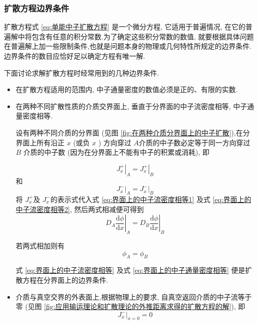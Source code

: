 \documentclass{Sichuan Normal University}
\begin{document}
\subsubsection{扩散方程边界条件}
扩散方程式 \eqref{eq:单能中子扩散方程} 是一个微分方程, 它适用于普遍情况, 在它的普遍解中将包含有任意的积分常数.为了确定这些积分常数的数值, 就要根据具体问题在普遍解上加一些限制条件,也就是问题本身的物理或几何特性所规定的边界条件.边界条件的数目应恰好足以确定方程有唯一解.

下面讨论求解扩散方程时经常用到的几种边界条件.
\begin{itemize} 
    \item 在扩散方程适用的范围内, 中子通量密度的数值必须是正的、有限的实数.

    \item 在两种不同扩散性质的介质交界面上, 垂直于分界面的中子流密度相等, 中子通量密度相等.

设有两种不同介质的分界面 (见图 \ref{fig:在两种介质分界面上的中子扩散}),在分界面上所有沿正 $x$ (或负 $x$ ) 方向穿过 $A$介质的中子数必定等于同一方向穿过 $B$ 介质的中子数 (因为在分界面上不能有中子的积累或消耗), 即

\begin{equation}
\left.J_x^{+}\right|_A=\left.J_x^{+}\right|_B
\label{eq:界面上的中子流密度相等1}
\end{equation}
和
\begin{equation}
\left.J_x^{-}\right|_A=\left.J_x^{-}\right|_B
\label{eq:界面上的中子流密度相等2}
\end{equation}
将 $J_x^{+}$及 $J_x^{-}$的表示式代入式 \eqref{eq:界面上的中子流密度相等1} 及式 \eqref{eq:界面上的中子流密度相等2}, 然后两式相减便可得到
\begin{equation}
\left.D_A \frac{\mathrm{d} \phi}{\mathrm{d} x}\right|_A=\left.D_B \frac{\mathrm{d} \phi}{\mathrm{d} x}\right|_B
\label{eq:界面上的中子流密度相等}
\end{equation}

若两式相加则有
\begin{equation}
\phi_A=\phi_B
\label{eq:界面上的中子通量密度相等}
\end{equation}

式  \eqref{eq:界面上的中子流密度相等} 及式 \eqref{eq:界面上的中子通量密度相等} 便是扩散方程在分界面上的边界条件.

\item 介质与真空交界的外表面上,根据物理上的要求, 自真空返回介质的中子流等于零 (见图 \ref{fig:应用输运理论和扩散理论的外推距离求得的扩散方程的解}), 即
\begin{equation}
\left.J_x^{-}\right|_{x=0}=0
\end{equation}


\end{itemize}
\end{document}
